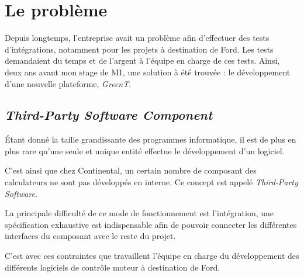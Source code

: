 \chapter{Le problème} \label{chapPb}
\putminitoc
Depuis longtemps, l'entreprise avait un problème afin d'effectuer des tests d'intégrations, notamment pour les projets à destination de Ford. Les tests demandaient du temps et de l'argent à l'équipe en charge de ces tests. Ainsi, deux ans avant mon stage de M1, une solution à été trouvée : le développement d'une nouvelle plateforme, \textit{GreenT}.
	\section{\textit{Third-Party Software Component}}
	Étant donné la taille grandissante des programmes informatique, il est de plus en plus rare qu'une seule et unique entité effectue le développement d'un logiciel.
	
	C'est ainsi que chez Continental, un certain nombre de composant des calculateurs ne sont pas développés en interne. Ce concept est appelé \textit{Third-Party Software}. 
	
	La principale difficulté de ce mode de fonctionnement est l'intégration, une spécification exhaustive est indispensable afin de pouvoir connecter les différentes interfaces du composant avec le reste du projet. 
	
	C'est avec ces contraintes que travaillent l'équipe en charge du développement des différents logiciels de contrôle moteur à destination de Ford.
	
